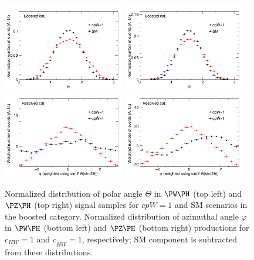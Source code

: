 \documentclass[a4paper,11pt]{article}
\begin{document}
\begin{figure}[hbtp]
\begin{center}
\includegraphics[width=0.475\textwidth]{Figures/New/RECO/Boosted_Plot_Theta_WH.png}
\includegraphics[width=0.475\textwidth]{Figures/New/RECO/Boosted_Plot_Theta_ZH.png}
\includegraphics[width=0.475\textwidth]{Figures/New/RECO/Resolved_Plot_phi_WH_CP.png}
\includegraphics[width=0.475\textwidth]{Figures/New/RECO/Resolved_Plot_phi_ZH_CP.png}
\end{center}
\caption{
Normalized distribution of polar angle $\Theta$ in $\PW\PH$ (top left) and $\PZ\PH$ (top right) signal samples for $cpW=1$ and SM scenarios in the boosted category. 
Normalized distribution of azimuthal angle $\varphi$ in  $\PW\PH$ (bottom left) and $\PZ\PH$ (bottom right) productions for $c_{HW}=1$ and $c_{H\widetilde{W}}=1$, respectively; SM component is subtracted from these distributions.
}
\label{fig:angles}
\end{figure}
\end{document}
